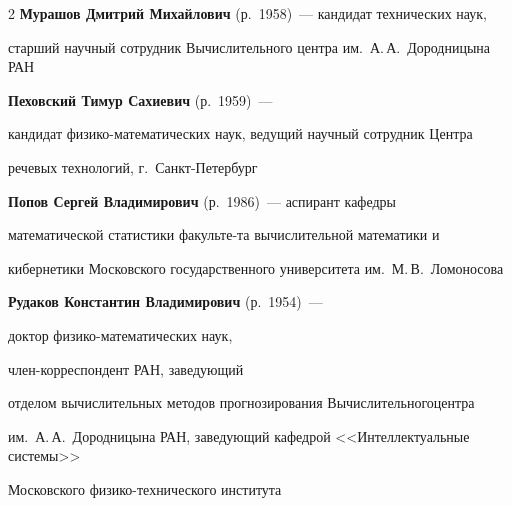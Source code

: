 \begin{multicols}{2}
\textbf{Мурашов Дмитрий Михайлович} (р.\ 1958)~--- кандидат технических наук, 

старший научный сотрудник Вычислительного центра им.~А.\,А.~Дородницына РАН 



\vspace*{4pt}



\noindent

\textbf{Пеховский Тимур Сахиевич} (р.\ 1959)~--- 

кандидат фи\-зи\-ко-математических наук, ведущий научный сотрудник Центра 

речевых технологий, г.~Санкт-Пе\-тер\-бург



\vspace*{4pt}



\noindent

\textbf{Попов Сергей Владимирович} (р.\ 1986)~--- аспирант кафедры 

математической статистики факульте-\linebreak та вычисли\-тельной математики и 

кибернетики Московского государственного университета им.~М.\,В.~Ломоносова



\pagebreak






\noindent

\textbf{Рудаков Константин Владимирович} (р.\ 1954)~--- 

доктор физико-математических наук, 

член-коррес\-пон\-дент РАН, заведующий 

отделом вычислительных методов прогнозирования Вычислительного\linebreak центра 

им.\ А.\,А.~Дородницына РАН, за\-ве\-ду\-ющий кафедрой <<Интеллектуальные системы>> 

Московского фи\-зи\-ко-тех\-ни\-че\-ско\-го института



\vspace*{4pt}



\def\leftfootline{\small{\textbf{\thepage}

\hfill ИНФОРМАТИКА И ЕЁ ПРИМЕНЕНИЯ\ \ \ том~6\ \ \ выпуск~1\ \ \ 2012}

}
\end{multicols}
